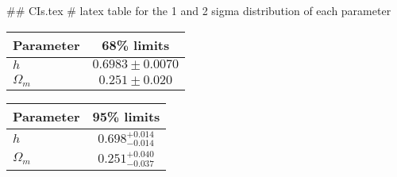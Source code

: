 ## CIs.tex
# latex table for the 1 and 2 sigma distribution of each parameter

\begin{tabular} { l  c}
 Parameter &  68\% limits\\
\hline
{\boldmath$h              $} & $0.6983\pm 0.0070          $\\
{\boldmath$\Omega_m       $} & $0.251\pm 0.020            $\\
\hline
\end{tabular}

\begin{tabular} { l  c}
 Parameter &  95\% limits\\
\hline
{\boldmath$h              $} & $0.698^{+0.014}_{-0.014}   $\\
{\boldmath$\Omega_m       $} & $0.251^{+0.040}_{-0.037}   $\\
\hline
\end{tabular}
